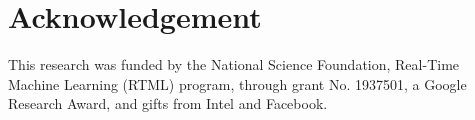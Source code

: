\section*{Acknowledgement}
This research was funded by the National Science Foundation, Real-Time Machine Learning (RTML) program, through grant No. 1937501, a Google Research Award, and gifts from Intel and Facebook.